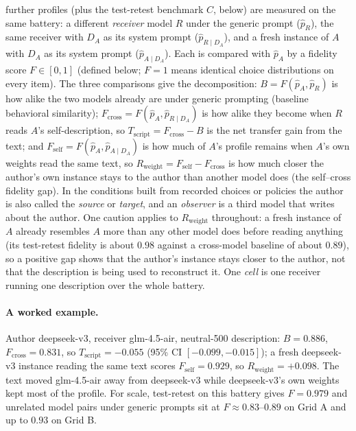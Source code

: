 \documentclass[11pt]{article}
\newcommand{\Fself}{F_{\mathrm{self}}}
\newcommand{\Fcross}{F_{\mathrm{cross}}}
\newcommand{\B}{B}
\newcommand{\Tscript}{T_{\mathrm{script}}}
\newcommand{\Rweight}{R_{\mathrm{weight}}}
\begin{document}
further profiles (plus the test-retest benchmark $C$, below) are measured on
the same battery: a different \emph{receiver}
model $R$ under the generic prompt ($\hat p_R$), the same receiver with $D_A$
as its system prompt ($\hat p_{R\mid D_A}$), and a fresh instance of $A$ with
$D_A$ as its system prompt ($\hat p_{A\mid D_A}$). Each is compared with
$\hat p_A$ by a fidelity score $F \in [0,1]$ (defined below; $F=1$ means
identical choice distributions on every item). The three comparisons give the
decomposition: $\B = F(\hat p_A, \hat p_R)$ is how alike the two models already
are under generic prompting (baseline behavioral similarity); $\Fcross = F(\hat p_A,
\hat p_{R\mid D_A})$ is how alike they become when $R$ reads $A$'s
self-description, so $\Tscript = \Fcross - \B$ is the net transfer gain from
the text; and $\Fself = F(\hat p_A, \hat p_{A\mid D_A})$ is how
much of $A$'s profile remains when $A$'s own weights read the same text, so
$\Rweight = \Fself - \Fcross$ is how much closer the author's own instance
stays to the author than another model does (the self--cross fidelity gap).
In the conditions built from recorded choices or policies the author is also
called the \emph{source} or \emph{target}, and an \emph{observer} is a third
model that writes about the author.
One caution applies to
$\Rweight$ throughout: a fresh instance of $A$ already resembles $A$ more
than any other model does before reading anything (its test-retest fidelity
is about $0.98$ against a cross-model baseline of about $0.89$), so a
positive gap shows that the author's instance stays closer to the author,
not that the description is being used to reconstruct it. One \emph{cell} is
one receiver running one description over the whole battery.

\paragraph{A worked example.} Author deepseek-v3, receiver glm-4.5-air,
neutral-500 description: $\B = 0.886$, $\Fcross = 0.831$, so
$\Tscript = -0.055$ (95\% CI $[-0.099, -0.015]$); a fresh deepseek-v3
instance reading the same text scores $\Fself = 0.929$, so
$\Rweight = +0.098$. The text moved glm-4.5-air away from deepseek-v3 while
deepseek-v3's own weights kept most of the profile. For scale, test-retest
on this battery gives $F = 0.979$ and unrelated model pairs under generic
prompts sit at $F \approx 0.83$--$0.89$ on Grid A and up to $0.93$ on Grid B.
\end{document}
